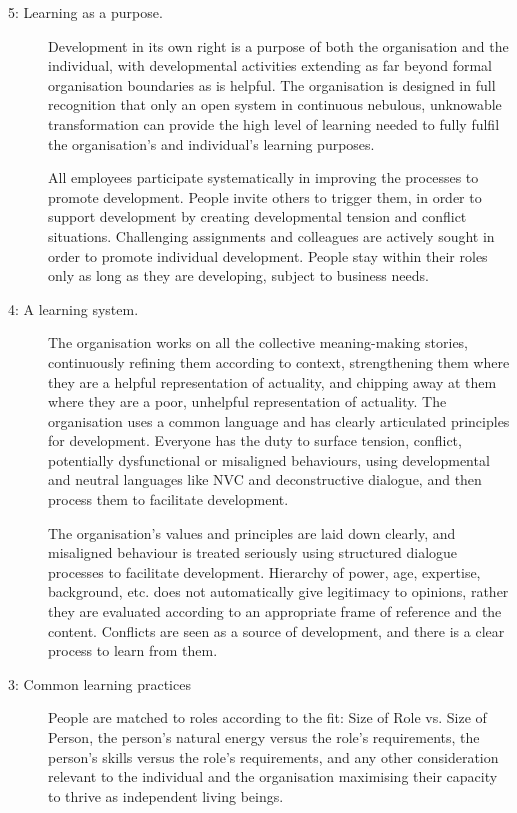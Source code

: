 \begin{description}
\item[5: Learning as a purpose.] 
Development in its own right is a purpose of both the organisation and the individual, with developmental activities extending as far beyond formal organisation boundaries as is helpful. The organisation is designed in full recognition that only an open system in continuous nebulous, unknowable transformation can provide the high level of learning needed to fully fulfil the organisation's and individual's learning purposes. 

All employees participate systematically in improving the processes to promote development. People invite others to trigger them, in order to support development by creating developmental tension and conflict situations. Challenging assignments and colleagues are actively sought in order to promote individual development. People stay within their roles only as long as they are developing, subject to business needs.


\item[4: A learning system.]  
The organisation works on all the collective meaning\hyp{}making stories, continuously refining them according to context, strengthening them where they are a helpful representation of actuality, and chipping away at them where they are a poor, unhelpful representation of actuality. The organisation uses a common language and has clearly articulated principles for development. Everyone has the duty to surface tension, conflict, potentially dysfunctional or misaligned behaviours, using developmental and neutral languages like NVC and deconstructive dialogue, and then process them to facilitate development. 


The organisation’s values and principles are laid down clearly, and misaligned behaviour is treated seriously using structured dialogue processes to facilitate development. Hierarchy of power, age, expertise, background, etc. does not automatically give legitimacy to opinions, rather they are evaluated according to an appropriate frame of reference and the content. Conflicts are seen as a source of development, and there is a clear process to learn from them.


\item[3: Common learning practices]  
People are matched to roles according to the fit: Size of Role vs. Size of Person,  the person’s natural energy versus the role’s requirements, the person’s skills versus the role’s requirements, and any other consideration relevant to the individual and the organisation maximising their capacity to thrive as independent living beings.  


\end{description}

